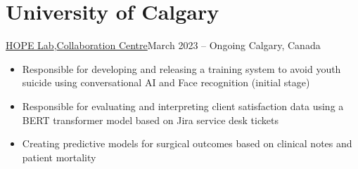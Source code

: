 \documentclass[10pt,a4paper]{altacv}
\begin{document}




%

\begin{fullwidth}
	\makecvheader
\end{fullwidth}



\section*{University of Calgary}
{\href{https://www.hopelab.ca/school-based-suicide-prevention}{HOPE Lab},\href{https://www.hopelab.ca/school-based-suicide-prevention}{Collaboration Centre}}{March 2023 -- Ongoing }{Calgary, Canada}

\begin{itemize}
	\item Responsible for developing and releasing a training system to avoid youth suicide using conversational AI and Face recognition (initial stage)
	      
\end{itemize}

\hfill

\begin{itemize}
	\item Responsible for evaluating and interpreting client satisfaction data using a BERT transformer model based on Jira service desk tickets
	\item Creating predictive models for surgical outcomes based on clinical notes and patient mortality
	      
\end{itemize}

%

\hfill

\end{document}
